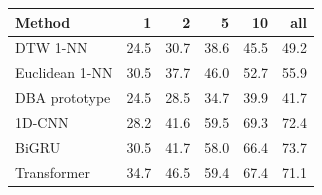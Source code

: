 \begin{tabular}{lrrrrr}
\toprule
Method & 1 & 2 & 5 & 10 & all \\
\midrule
DTW 1-NN & 24.5 & 30.7 & 38.6 & 45.5 & 49.2 \\
Euclidean 1-NN & 30.5 & 37.7 & 46.0 & 52.7 & 55.9 \\
DBA prototype & 24.5 & 28.5 & 34.7 & 39.9 & 41.7 \\
1D-CNN & 28.2 & 41.6 & 59.5 & 69.3 & 72.4 \\
BiGRU & 30.5 & 41.7 & 58.0 & 66.4 & 73.7 \\
Transformer & 34.7 & 46.5 & 59.4 & 67.4 & 71.1 \\
\bottomrule
\end{tabular}
